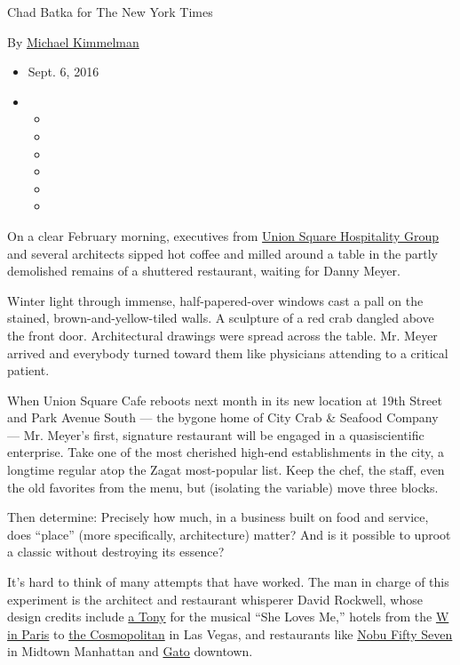 Chad Batka for The New York Times

By \href{http://www.nytimes3xbfgragh.onion/by/michael-kimmelman}{Michael
Kimmelman}

\begin{itemize}
\item
  Sept. 6, 2016
\item
  \begin{itemize}
  \item
  \item
  \item
  \item
  \item
  \item
  \end{itemize}
\end{itemize}

On a clear February morning, executives from
\href{https://www.google.com/search?q=Union+Square+Hospitality+Group\&ie=utf-8\&oe=utf-8}{Union
Square Hospitality Group} and several architects sipped hot coffee and
milled around a table in the partly demolished remains of a shuttered
restaurant, waiting for Danny Meyer.

Winter light through immense, half-papered-over windows cast a pall on
the stained, brown-and-yellow-tiled walls. A sculpture of a red crab
dangled above the front door. Architectural drawings were spread across
the table. Mr. Meyer arrived and everybody turned toward them like
physicians attending to a critical patient.

When Union Square Cafe reboots next month in its new location at 19th
Street and Park Avenue South --- the bygone home of City Crab \& Seafood
Company --- Mr. Meyer's first, signature restaurant will be engaged in a
quasiscientific enterprise. Take one of the most cherished high-end
establishments in the city, a longtime regular atop the Zagat
most-popular list. Keep the chef, the staff, even the old favorites from
the menu, but (isolating the variable) move three blocks.

Then determine: Precisely how much, in a business built on food and
service, does ``place'' (more specifically, architecture) matter? And is
it possible to uproot a classic without destroying its essence?

It's hard to think of many attempts that have worked. The man in charge
of this experiment is the architect and restaurant whisperer David
Rockwell, whose design credits include
\href{http://www.nytimes3xbfgragh.onion/live/2016-tony-awards/best-scenic-design-of-a-musical/}{a
Tony} for the musical ``She Loves Me,'' hotels from the
\href{http://www.wparisopera.com/}{W in Paris} to
\href{https://www.cosmopolitanlasvegas.com/}{the Cosmopolitan} in Las
Vegas, and restaurants like
\href{http://www.noburestaurants.com/fifty-seven/experience/}{Nobu Fifty
Seven} in Midtown Manhattan and \href{http://gatonyc.com/}{Gato}
downtown.

